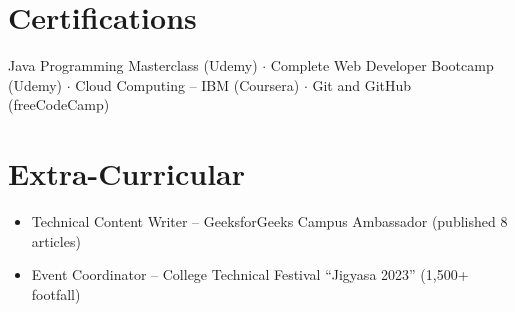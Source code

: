 \documentclass[10pt,a4paper]{article}
\begin{document}
\section{Certifications}
Java Programming Masterclass (Udemy) $\cdot$ Complete Web Developer Bootcamp (Udemy) $\cdot$ Cloud Computing -- IBM (Coursera) $\cdot$ Git and GitHub (freeCodeCamp)

\section{Extra-Curricular}
\begin{itemize}
    \item Technical Content Writer -- GeeksforGeeks Campus Ambassador (published 8 articles)
    \item Event Coordinator -- College Technical Festival ``Jigyasa 2023'' (1,500+ footfall)
\end{itemize}
\end{document}
